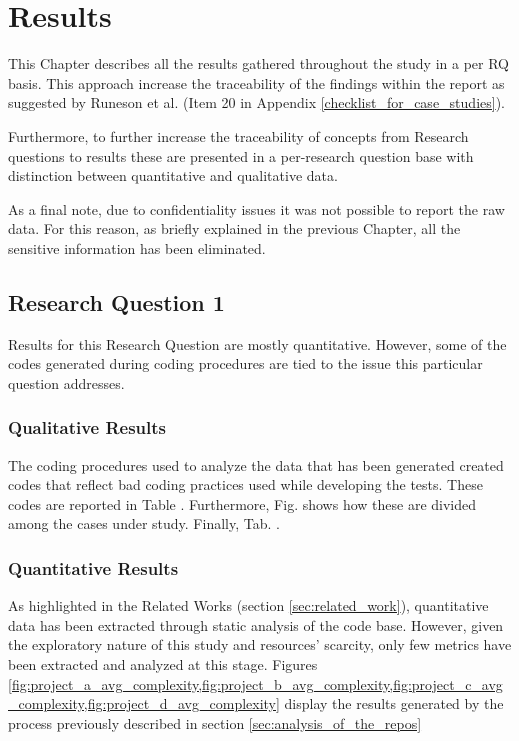 \chapter{Results} \label{study_results}

This Chapter describes all the results gathered throughout the study in a per RQ basis. This approach increase the traceability of the findings within the report as suggested by Runeson et al. \cite{case_study_software_engineering} (Item 20 in Appendix \ref{checklist_for_case_studies}).

Furthermore, to further increase the traceability of concepts from Research questions to results these are presented in a per-research question base with distinction between quantitative and qualitative data.

As a final note, due to confidentiality issues it was not possible to report the raw data. For this reason, as briefly explained in the previous Chapter, all the sensitive information has been eliminated.

\section{Research Question 1}

Results for this Research Question are mostly quantitative. However, some of the codes generated during coding procedures are tied to the issue this particular question addresses.

\subsection{Qualitative Results}
    The coding procedures used to analyze the data that has been generated created codes that reflect bad coding practices used while developing the tests. These codes are reported in Table . Furthermore, Fig.  shows how these are divided among the cases under study. Finally, Tab. .
    

\subsection{Quantitative Results}

    As highlighted in the Related Works (section \ref{sec:related_work}), quantitative data has been extracted through static analysis of the code base. However, given the exploratory nature of this study and resources' scarcity, only few metrics have been extracted and analyzed at this stage. Figures \ref{fig:project_a_avg_complexity,fig:project_b_avg_complexity,fig:project_c_avg_complexity,fig:project_d_avg_complexity} display the results generated by the process previously described in section \ref{sec:analysis_of_the_repos}
    

